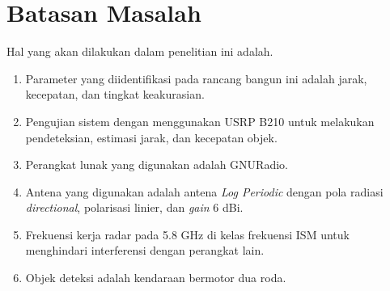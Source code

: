 \section{Batasan Masalah}
Hal yang akan dilakukan dalam penelitian ini adalah.
\begin{enumerate}[itemsep=1pt, topsep=1pt]
	\item Parameter yang diidentifikasi pada rancang bangun ini adalah jarak, kecepatan, dan tingkat keakurasian.
	\item Pengujian sistem dengan menggunakan USRP B210 untuk melakukan pendeteksian, estimasi jarak, dan kecepatan objek.
	\item Perangkat lunak yang digunakan adalah GNURadio.
	\item Antena yang digunakan adalah antena \textit{Log Periodic} dengan pola radiasi \textit{directional}, polarisasi linier, dan \textit{gain} 6 dBi.
	\item Frekuensi kerja radar pada 5.8 GHz di kelas frekuensi ISM untuk menghindari interferensi dengan perangkat lain.
	\item Objek deteksi adalah kendaraan bermotor dua roda.
\end{enumerate}

